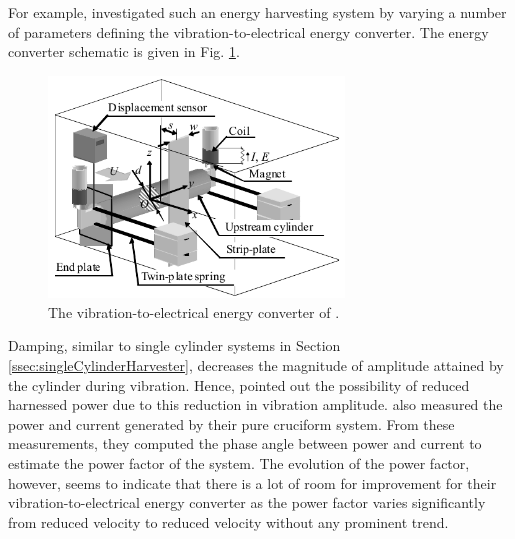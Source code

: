 \documentclass[oneside]{utmthesis}
\begin{document}
For example, \citet{Koide2009} investigated such an energy harvesting system by varying a number of parameters defining the vibration-to-electrical energy converter. The energy converter schematic is given in Fig. \ref{fig:coilGenerator}.

\begin{figure}[!h]
  \centering
  \hspace{1cm} \includegraphics[width=0.7\textwidth]{figs/coilGenerator}
  \caption{The vibration-to-electrical energy converter of \citet{Koide2009}.}
  \label{fig:coilGenerator}
\end{figure}

\noindent Damping, similar to single cylinder systems in Section \ref{ssec:singleCylinderHarvester}, decreases the magnitude of amplitude attained by the cylinder during vibration. Hence, \citet{Koide2009} pointed out the possibility of reduced harnessed power due to this reduction in vibration amplitude. \citet{Koide2009} also measured the power and current generated by their pure cruciform system. From these measurements, they computed the phase angle between power and current to estimate the power factor of the system. The evolution of the power factor, however, seems to indicate that there is a lot of room for improvement for their vibration-to-electrical energy converter as the power factor varies significantly from reduced velocity to reduced velocity without any prominent trend.
\end{document}
